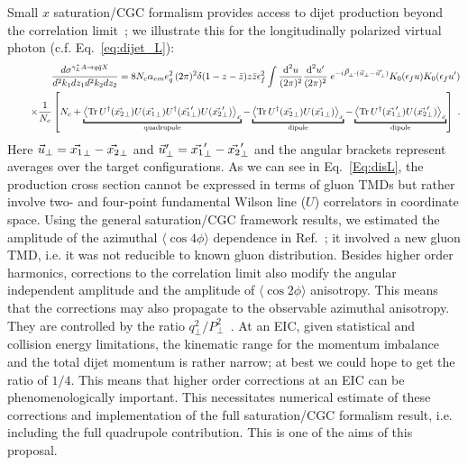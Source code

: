 { 
	Small $x$ saturation/CGC formalism provides access to dijet production beyond the
	correlation limit~\cite{Dominguez:2011wm}; we illustrate this for the longitudinally 
	polarized virtual photon (c.f. Eq.~\eqref{eq:dijet_L}): 
	\begin{eqnarray}
&&\frac{d\sigma ^{\gamma_{L}^{\ast }A\rightarrow q\bar{q}X}}{d^2k_1dz_1d^2k_2dz_2}
= 8N_{c}\alpha _{em}e_{q}^{2} \, (2\pi)^2 \delta(1 -z- \bar{z}) 
z \bar{z} \epsilon_f^2
\int \frac{\text{d}^{2}u}{(2\pi)^{2}}\frac{\text{d}^{2}u^{\prime }}{(2\pi )^{2}}
\; e^{-i \v{P}\cdot(\v{u}-\v{u}^{\prime})}
 K_0(\epsilon_f u )   K_0(\epsilon_f u^\prime)  \\
&&~~~~\times 
\frac{1}{N_c}\left[
N_c+
\underbracket{
\left< {\rm Tr}\,
U^\dagger(\v{x_2})  U(\v{x_1}) U^\dagger(\v{x_1}^{\prime})  U(\v{x_2}^{\prime})
\right>_x}_{\rm quadrupole} 
-
\underbracket{\left< {\rm Tr}\,
U^\dagger(\v{x_2})  U(\v{x_1}) \right>_x}_{\rm dipole}
-
\underbracket{
\left< {\rm Tr}\,
U^\dagger(\v{x_1}^\prime)  U(\v{x_2}^\prime) \right>_x }_{\rm dipole}
\right] ~.  \label{Eq:disL} \notag
\end{eqnarray}
Here $ \vec {u}_\perp = \vec {x_1}_\perp - \vec {x_2}_\perp $ and $ \vec {u}_\perp ^\prime= \vec {x_1}_\perp ^\prime- \vec {x_2}_\perp ^\prime$ and the angular brackets  represent averages over the 
target configurations. 
As we can see in Eq.~\eqref{Eq:disL},  the production cross section cannot be expressed in terms of  
	gluon TMDs but rather involve two- and four-point fundamental Wilson line ($U$) correlators  in coordinate space. 
	Using the general saturation/CGC framework results,  we 
	estimated the amplitude of the azimuthal $\langle \cos 4\phi  \rangle$
	dependence in Ref.~\cite{Dumitru:2016jku}; it involved a new gluon TMD, i.e. it was not reducible to known gluon distribution. 
	Besides higher order harmonics, corrections to the correlation limit also 
	modify the angular independent amplitude and the amplitude of $\langle \cos 2\phi  \rangle$ anisotropy.
	This means that the corrections may also propagate to the observable azimuthal anisotropy.  
	They are controlled by the ratio $q_\perp^2/P_\perp^2$~\cite{Dumitru:2016jku}.    
	At an EIC, given statistical and collision energy limitations,  the kinematic range for the momentum imbalance and the 
	total dijet momentum is rather narrow; at best we could hope to get the ratio of $1/4$.
	This means that higher order corrections at an EIC can be phenomenologically important. 
	This necessitates numerical estimate of these corrections and implementation of the 
	full saturation/CGC formalism result, i.e. including the   full quadrupole contribution.   
	This is one of the aims of this proposal. 
	}




